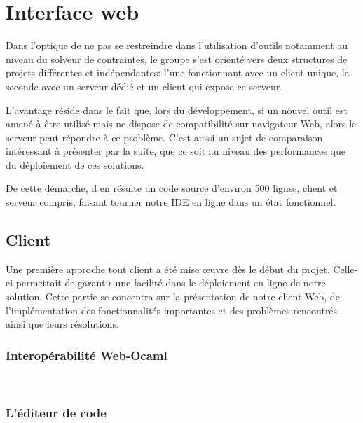 \documentclass[12pt]{article}
\begin{document}
\newpage

\hypertarget{interface-web}{%
  \section{Interface web}\label{interface-web}}

Dans l'optique de ne pas se restreindre dans l'utilisation d'outils
notamment au niveau du solveur de contraintes, le groupe s'est orienté
vers deux structures de projets différentes et indépendantes: l'une
fonctionnant avec un client unique, la seconde avec un serveur dédié et
un client qui expose ce serveur.

L'avantage réside dans le fait que, lors du développement, si un nouvel
outil est amené à être utilisé mais ne dispose de compatibilité sur
navigateur Web, alors le serveur peut répondre à ce problème. C'est
aussi un sujet de comparaison intéressant à présenter par la suite, que
ce soit au niveau des performances que du déploiement de ces solutions.

De cette démarche, il en résulte un code source d'environ 500 lignes,
client et serveur compris, faisant tourner notre IDE en ligne dans un
état fonctionnel.

\subsection{Client}

Une première approche tout client a été mise œuvre dès le début du
projet. Celle-ci permettait de garantir une facilité dans le déploiement
en ligne de notre solution. Cette partie se concentra sur la présentation de 
notre client Web, de l'implémentation des fonctionnalités importantes et des problèmes rencontrés ainsi que leurs résolutions.

\subsubsection{Interopérabilité Web-Ocaml}\

\subsubsection{L'éditeur de code}\
\end{document}
